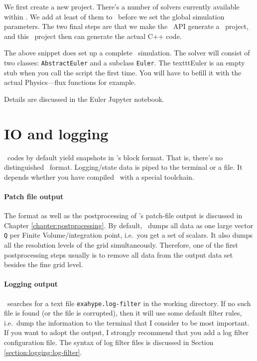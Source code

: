 \noindent
We first create a new project.
There's a number of solvers currently available within \ExaHyPE.
We add at least of them to \ExaHyPE\ before we set the global simulation
parameters.
The two final steps are that we make the \ExaHyPE\ API generate a \Peano\
project, and this \Peano\ project then can generate the actual C++ code.


The above snippet does set up a complete \ExaHyPE\ simulation.
The solver will consist of two classes: \texttt{AbstractEuler} and a subclass
\texttt{Euler}.
The texttt{Euler} is an empty stub when you call the script the first time.
You will have to befill it with the actual Physics---flux functions for example.


Details are discussed in the Euler Jupyter notebook.


\section{IO and logging}


\ExaHyPE\ codes by default yield snapshots in \Peano's block format. 
That is, there's no distinguished \ExaHyPE\ format. 
Logging/state data is piped to the terminal or a file. 
It depends whether you have compiled \Peano\ with a special toolchain.


\paragraph{Patch file output}

The format as well as the postprocessing of \Peano's patch-file output is
discussed in Chapter \ref{chapter:postprocessing}.
By default, \ExaHyPE\ dumps all data as one large vector \texttt{Q} per Finite
Volume/integration point, i.e.~you get a set of scalars.
It also dumps all the resolution levels of the grid simultaneously.
Therefore, one of the first postprocessing steps usually is to remove all data
from the output data set besides the fine grid level.


\paragraph{Logging output}

\ExaHyPE\ searches for a text file \texttt{exahype.log-filter} in the working
directory.
If no such file is found (or the file is corrupted), then it will use some
default filter rules, i.e.~dump the information to the terminal that I consider
to be most important.
If you want to adopt the output, I strongly recommend that you add a log filter
configuration file. 
The syntax of log filter files is discussed in Section
\ref{section:logging:log-filter}.



